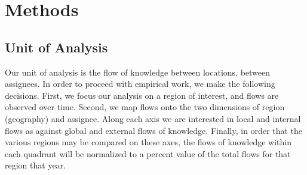 \documentclass[12pt]{article}
\begin{document}
\section{Methods}
\subsection{Unit of Analysis}
Our unit of analysis is the flow of knowledge between locations, between assignees. In order to proceed with empirical work, we make the following decisions.  First, we focus our analysis on a region of interest, and flows are observed over time. Second, we map flows onto the two dimensions of region (geography) and assignee. Along each axis we are interested in local and internal flows as against global and external flows of knowledge. Finally, in order that the various regions may be compared on these axes, the flows of knowledge within each quadrant will be normalized to a percent value of the total flows for that region that year. 
\end{document}
